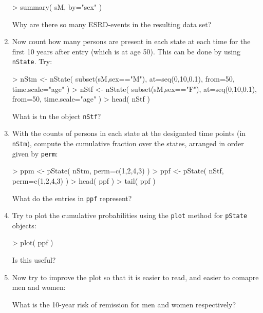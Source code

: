 \begin{enumerate}[resume]
\begin{Schunk}
\begin{Sinput}
> summary( sM, by="sex" )
\end{Sinput}
\end{Schunk}
Why are there so many ESRD-events in the resulting data set?
\item Now count how many persons are present in each state
  at each time for the first 10 years after entry (which is at age 50). This
  can be done by using \texttt{nState}. Try:
\begin{Schunk}
\begin{Sinput}
> nStm <- nState( subset(sM,sex=="M"), at=seq(0,10,0.1), from=50, time.scale="age" )
> nStf <- nState( subset(sM,sex=="F"), at=seq(0,10,0.1), from=50, time.scale="age" )
> head( nStf )
\end{Sinput}
\end{Schunk}
What is tn the object \texttt{nStf}?
\item With the counts of persons in each state at the
  designated time points (in \texttt{nStm}), compute the cumulative fraction over the
  states, arranged in order given by \texttt{perm}:
\begin{Schunk}
\begin{Sinput}
> ppm <- pState( nStm, perm=c(1,2,4,3) )
> ppf <- pState( nStf, perm=c(1,2,4,3) )
> head( ppf )
> tail( ppf )
\end{Sinput}
\end{Schunk}
What do the entries in \texttt{ppf} represent?
\item Try to plot the cumulative probabilities using the \texttt{plot}
  method for \texttt{pState} objects:
\begin{Schunk}
\begin{Sinput}
> plot( ppf )
\end{Sinput}
\end{Schunk}
Is this useful?
\item Now try to improve the plot so that it is easier to read, and
  easier to comapre men and women:
\begin{Schunk}
\end{Schunk}
What is the 10-year risk of remission for men and women respectively?
\end{enumerate}
